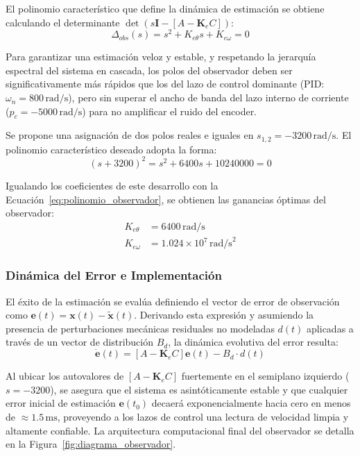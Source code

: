 \documentclass[10pt,a4paper]{article}
\begin{document}
El polinomio característico que define la dinámica de estimación se obtiene calculando el determinante $\det(s\mathbf{I} - [A - \mathbf{K}_e C])$:
\begin{equation}
    \Delta_{obs}(s) = s^2 + K_{e\theta} s + K_{e\omega} = 0
    \label{eq:polinomio_observador}
\end{equation}

Para garantizar una estimación veloz y estable, y respetando la jerarquía espectral del sistema en cascada, los polos del observador deben ser significativamente más rápidos que los del lazo de control dominante (PID: $\omega_n = 800\,\text{rad/s}$), pero sin superar el ancho de banda del lazo interno de corriente ($p_c = -5000\,\text{rad/s}$) para no amplificar el ruido del encoder. 

Se propone una asignación de dos polos reales e iguales en $s_{1,2} = -3200\,\text{rad/s}$. El polinomio característico deseado adopta la forma:
\begin{equation*}
    (s + 3200)^2 = s^2 + 6400 s + 10240000 = 0
\end{equation*}

Igualando los coeficientes de este desarrollo con la Ecuación~\eqref{eq:polinomio_observador}, se obtienen las ganancias óptimas del observador:
\begin{align*}
    K_{e\theta} &= 6400\,\text{rad/s} \\
    K_{e\omega} &= 1.024 \times 10^7\,\text{rad/s}^2
\end{align*}

\subsubsection{Dinámica del Error e Implementación}

El éxito de la estimación se evalúa definiendo el vector de error de observación como $\mathbf{e}(t) = \mathbf{x}(t) - \tilde{\mathbf{x}}(t)$. Derivando esta expresión y asumiendo la presencia de perturbaciones mecánicas residuales no modeladas $d(t)$ aplicadas a través de un vector de distribución $B_d$, la dinámica evolutiva del error resulta:
\begin{equation*}
    \dot{\mathbf{e}}(t) = \left[ A - \mathbf{K}_e C \right] \mathbf{e}(t) - B_d \cdot d(t)
\end{equation*}

Al ubicar los autovalores de $[A - \mathbf{K}_e C]$ fuertemente en el semiplano izquierdo ($s = -3200$), se asegura que el sistema es asintóticamente estable y que cualquier error inicial de estimación $\mathbf{e}(t_0)$ decaerá exponencialmente hacia cero en menos de $\approx 1.5\,\text{ms}$, proveyendo a los lazos de control una lectura de velocidad limpia y altamente confiable. La arquitectura computacional final del observador se detalla en la Figura~\ref{fig:diagrama_observador}.
\end{document}
